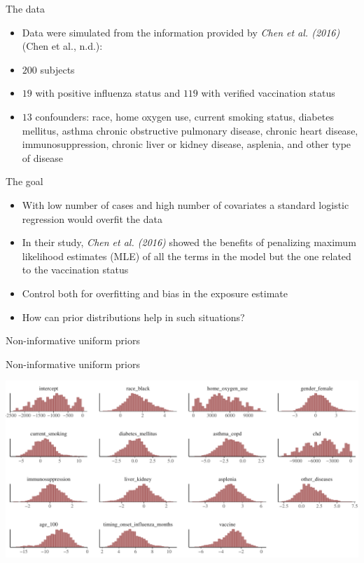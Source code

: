 \documentclass[ignorenonframetext,a4paper]{beamer}
\begin{document}
\begin{frame}{The data}

\begin{itemize}
\item
  Data were simulated from the information provided by \emph{Chen et al.
  (2016)} (Chen et al., n.d.):
\item
  \(200\) subjects
\item
  \(19\) with positive influenza status and \(119\) with verified
  vaccination status
\item
  \(13\) confounders: race, home oxygen use, current smoking status,
  diabetes mellitus, asthma chronic obstructive pulmonary disease,
  chronic heart disease, immunosuppression, chronic liver or kidney
  disease, asplenia, and other type of disease
\end{itemize}

\end{frame}

\begin{frame}{The goal}

\begin{itemize}
\item
  With low number of cases and high number of covariates a standard
  logistic regression would overfit the data
\item
  In their study, \emph{Chen et al. (2016)} showed the benefits of
  penalizing maximum likelihood estimates (MLE) of all the terms in the
  model but the one related to the vaccination status
\item
  Control both for overfitting and bias in the exposure estimate
\item
  How can prior distributions help in such situations?
\end{itemize}

\end{frame}

\begin{frame}{Non-informative uniform priors}

\end{frame}

\begin{frame}{Non-informative uniform priors}

\includegraphics{DB_presentation_case_study_files/figure-beamer/unnamed-chunk-25-1.pdf}

\end{frame}
\end{document}
